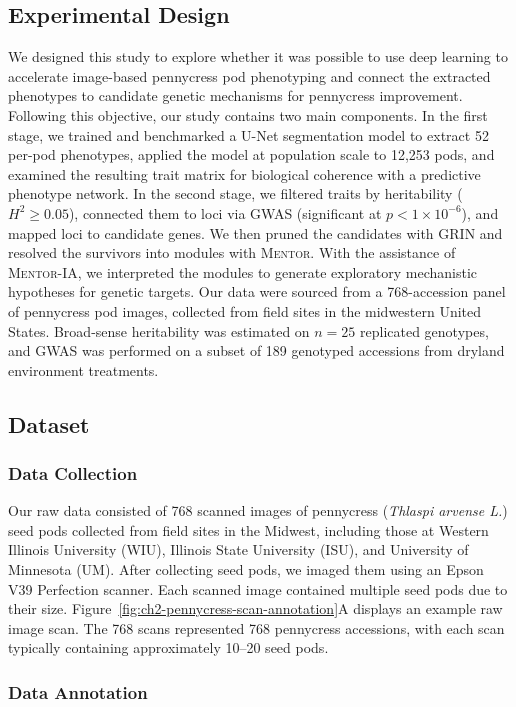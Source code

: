 \subsection{Experimental Design}
We designed this study to explore whether it was possible to use deep learning to accelerate image-based pennycress pod phenotyping and connect the extracted phenotypes to candidate genetic mechanisms for pennycress improvement. Following this objective, our study contains two main components. In the first stage, we trained and benchmarked a U-Net segmentation model to extract 52 per-pod phenotypes, applied the model at population scale to 12,253 pods, and examined the resulting trait matrix for biological coherence with a predictive phenotype network. In the second stage, we filtered traits by heritability ($H^2 \geq 0.05$), connected them to loci via GWAS (significant at $p < 1 \times 10^{-6}$), and mapped loci to candidate genes. We then pruned the candidates with GRIN and resolved the survivors into modules with \textsc{Mentor}. With the assistance of \textsc{Mentor-IA}, we interpreted the modules to generate exploratory mechanistic hypotheses for genetic targets. Our data were sourced from a 768-accession panel of pennycress pod images, collected from field sites in the midwestern United States. Broad-sense heritability was estimated on $n=25$ replicated genotypes, and GWAS was performed on a subset of 189 genotyped accessions from dryland environment treatments.

\subsection{Dataset}\label{sec:ch2-pennycress-dataset}
\subsubsection{Data Collection}
Our raw data consisted of 768 scanned images of pennycress (\textit{Thlaspi arvense L.}) seed pods collected from field sites in the Midwest, including those at Western Illinois University (WIU), Illinois State University (ISU), and University of Minnesota (UM). After collecting seed pods, we imaged them using an Epson V39 Perfection scanner. Each scanned image contained multiple seed pods due to their size. Figure~\ref{fig:ch2-pennycress-scan-annotation}A displays an example raw image scan. The 768 scans represented 768 pennycress accessions, with each scan typically containing approximately 10--20 seed pods.

\subsubsection{Data Annotation}\label{sec:ch2-annotation}

